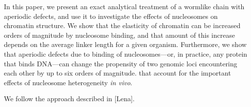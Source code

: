 \documentclass[%
 reprint,
superscriptaddress,
showpacs,preprintnumbers,
 amsmath,amssymb,
 aps,
 prl,
]{revtex4-1}
\begin{document}
In this paper, we present an exact analytical treatment of a wormlike chain
    with aperiodic defects, and use it to investigate the effects of nucleosomes
    on chromatin structure.
We show that the elasticity of chromatin can be increased orders of magnitude by
    nucleosome binding, and that amount of this increase depends on the average
    linker length for a given organism.
Furthermore, we show that aperiodic defects due to binding of nucleosomes---or, in
    practice, any protein that binds DNA---can change the
    propensity of two genomic loci encountering each other by up to six
    orders of magnitude.
    that account for the important effects of nucleosome heterogeneity
    \textit{in vivo}.



We follow the approach described in [Lena].







\end{document}
